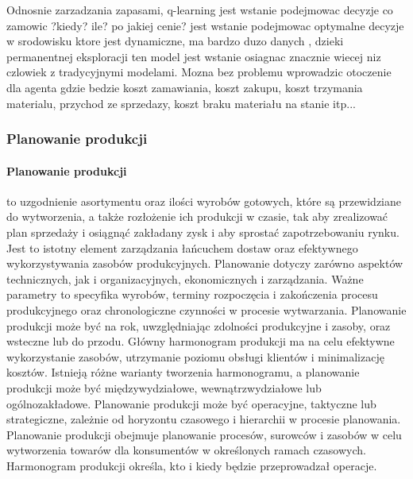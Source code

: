Odnosnie zarzadzania zapasami, q-learning jest wstanie podejmowac decyzje co zamowic ?kiedy? ile? po jakiej cenie? jest wstanie podejmowac optymalne decyzje w srodowisku ktore jest dynamiczne, ma bardzo duzo danych , dzieki permanentnej eksploracji ten model jest wstanie osiagnac znacznie wiecej niz czlowiek z tradycyjnymi modelami. Mozna bez problemu wprowadzic otoczenie dla agenta gdzie bedzie koszt zamawiania, koszt zakupu, koszt trzymania materialu, przychod ze sprzedazy, koszt braku materiału na stanie itp...

\cite{Had2023}\cite{wiksvr2023}\cite{alakh2023}\cite{intell2023}





\newpage
\subsubsection{Planowanie produkcji}
 \vspace{\baselineskip} 
\paragraph{Planowanie produkcji}
 \vspace{\baselineskip} 

to uzgodnienie asortymentu oraz ilości wyrobów gotowych, które są przewidziane do wytworzenia, a także rozłożenie ich produkcji w czasie, tak aby zrealizować plan sprzedaży i osiągnąć zakładany zysk i aby sprostać zapotrzebowaniu rynku. Jest to istotny element zarządzania łańcuchem dostaw oraz efektywnego wykorzystywania zasobów produkcyjnych.
Planowanie dotyczy zarówno aspektów technicznych, jak i organizacyjnych, ekonomicznych i zarządzania. Ważne parametry to specyfika wyrobów, terminy rozpoczęcia i zakończenia procesu produkcyjnego oraz chronologiczne czynności w procesie wytwarzania. Planowanie produkcji może być na rok, uwzględniając zdolności produkcyjne i zasoby, oraz wsteczne lub do przodu. Główny harmonogram produkcji ma na celu efektywne wykorzystanie zasobów, utrzymanie poziomu obsługi klientów i minimalizację kosztów. Istnieją różne warianty tworzenia harmonogramu, a planowanie produkcji może być międzywydziałowe, wewnątrzwydziałowe lub ogólnozakładowe. Planowanie produkcji może być operacyjne, taktyczne lub strategiczne, zależnie od horyzontu czasowego i hierarchii w procesie planowania. 
Planowanie produkcji obejmuje planowanie procesów, surowców i zasobów w celu wytworzenia towarów dla konsumentów w określonych ramach czasowych. Harmonogram produkcji określa, kto i kiedy będzie przeprowadzał operacje.


